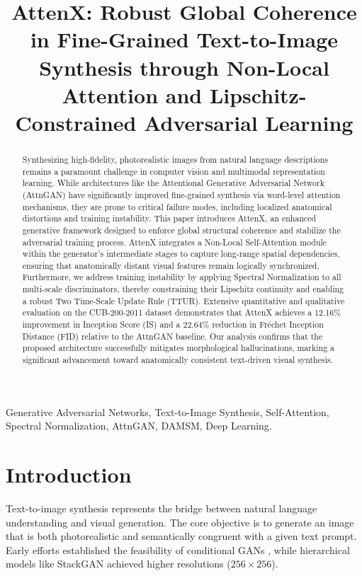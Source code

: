 \documentclass[conference]{IEEEtran}
\begin{document}
\title{AttenX: Robust Global Coherence in Fine-Grained Text-to-Image Synthesis through Non-Local Attention and Lipschitz-Constrained Adversarial Learning}


\maketitle

\begin{abstract}
Synthesizing high-fidelity, photorealistic images from natural language descriptions remains a paramount challenge in computer vision and multimodal representation learning. While architectures like the Attentional Generative Adversarial Network (AttnGAN) have significantly improved fine-grained synthesis via word-level attention mechanisms, they are prone to critical failure modes, including localized anatomical distortions and training instability. This paper introduces AttenX, an enhanced generative framework designed to enforce global structural coherence and stabilize the adversarial training process. AttenX integrates a Non-Local Self-Attention module within the generator's intermediate stages to capture long-range spatial dependencies, ensuring that anatomically distant visual features remain logically synchronized. Furthermore, we address training instability by applying Spectral Normalization to all multi-scale discriminators, thereby constraining their Lipschitz continuity and enabling a robust Two Time-Scale Update Rule (TTUR). Extensive quantitative and qualitative evaluation on the CUB-200-2011 dataset demonstrates that AttenX achieves a 12.16\% improvement in Inception Score (IS) and a 22.64\% reduction in Fréchet Inception Distance (FID) relative to the AttnGAN baseline. Our analysis confirms that the proposed architecture successfully mitigates morphological hallucinations, marking a significant advancement toward anatomically consistent text-driven visual synthesis.
\end{abstract}

\begin{IEEEkeywords}
Generative Adversarial Networks, Text-to-Image Synthesis, Self-Attention, Spectral Normalization, AttnGAN, DAMSM, Deep Learning.
\end{IEEEkeywords}

\section{Introduction}
Text-to-image synthesis represents the bridge between natural language understanding and visual generation. The core objective is to generate an image that is both photorealistic and semantically congruent with a given text prompt. Early efforts established the feasibility of conditional GANs \cite{reed2016generative}, while hierarchical models like StackGAN \cite{zhang2017stackgan} achieved higher resolutions ($256 \times 256$).
\end{document}
